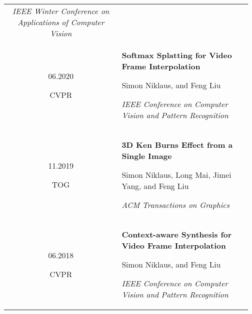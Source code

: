 \documentclass[10pt]{article}
\begin{document}
\begin{tabular}{C Z D}
{		\vspace{0.05cm}
		
		{\scriptsize \it IEEE Winter Conference on Applications of Computer Vision}
		
		\vspace{0.0cm}
	}
	\\
	{
		06.2020
		
		\vspace{-0.05cm}
		
		{\scriptsize CVPR}
	}
	&
	{
		{\bf Softmax Splatting for Video Frame Interpolation}
		
		\vspace{0.00cm}
		
		{\scriptsize Simon Niklaus, and Feng Liu}
		
		\vspace{0.05cm}
		
		{\scriptsize \it IEEE Conference on Computer Vision and Pattern Recognition}
		
		\vspace{0.0cm}
	}
	\\
	{
		11.2019
		
		\vspace{-0.05cm}
		
		{\scriptsize TOG}
	}
	&
	{
		{\bf 3D Ken Burns Effect from a Single Image}
		
		\vspace{0.00cm}
		
		{\scriptsize Simon Niklaus, Long Mai, Jimei Yang, and Feng Liu}
		
		\vspace{0.05cm}
		
		{\scriptsize \it ACM Transactions on Graphics}
		
		\vspace{0.0cm}
	}
	\\
	{
		06.2018
		
		\vspace{-0.05cm}
		
		{\scriptsize CVPR}
	}
	&
	{
		{\bf Context-aware Synthesis for Video Frame Interpolation}
		
		\vspace{0.00cm}
		
		{\scriptsize Simon Niklaus, and Feng Liu}
		
		\vspace{0.05cm}
		
		{\scriptsize \it IEEE Conference on Computer Vision and Pattern Recognition}
		
}
\end{tabular}
\end{document}
